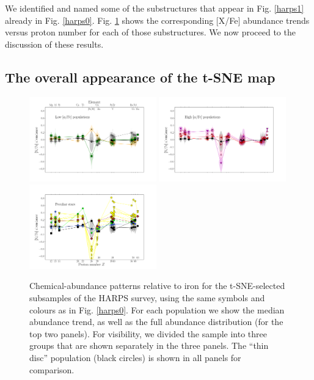 \documentclass{aa}  %
\begin{document}
We identified and named some of the substructures that appear in Fig. \ref{harps1} already in Fig. \ref{harps0}. Fig. \ref{harps3} shows the corresponding [X/Fe] abundance trends versus proton number for each of those substructures. 
We now proceed to the discussion of these results.

\subsection{The overall appearance of the t-SNE map}

\begin{figure}\centering
 \includegraphics[trim=0cm 2cm 0cm 0cm, clip=true, width=0.49\textwidth]{im/harps_tsne_abundances-relto-Fe_thin.png}
 \includegraphics[trim=0cm 2cm 0cm 2cm, clip=true, width=0.49\textwidth]{im/harps_tsne_abundances-relto-Fe_thick.png}
 \includegraphics[trim=0cm 0 0cm 2cm, clip=true, width=0.49\textwidth]{im/harps_tsne_abundances-relto-Fe_strange.png}
\caption{Chemical-abundance patterns relative to iron for the t-SNE-selected subsamples of the HARPS survey, using the same symbols and colours as in Fig. \ref{harps0}. For each population we show the median abundance trend, as well as the full abundance distribution (for the top two panels). For visibility, we divided the sample into three groups that are shown separately in the three panels. The ``thin disc'' population (black circles) is shown in all panels for comparison.}
\label{harps3}
\end{figure}
\end{document}
